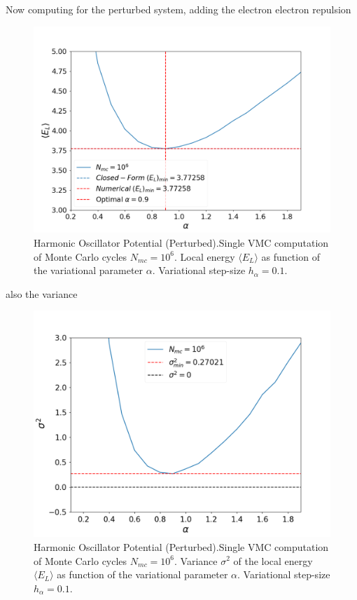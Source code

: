 \documentclass[aip,nobalancelastpage,
twocolumn,
rsi,%
 amsmath,amssymb,
 reprint,%
]{revtex4}
\begin{document}
Now computing for the perturbed system, adding the electron electron repulsion

\begin{figure}[H]
\center
\includegraphics[scale=0.32]{figsPartI/IStabilityPertE.png}
\caption{Harmonic Oscillator Potential (Perturbed).\newline Single VMC computation of Monte Carlo cycles $N_{mc}=10^6$. Local energy $\langle E_L \rangle$ as function of the variational parameter $\alpha$. Variational step-size $h_\alpha = 0.1$.}
\label{Ifig5}
\end{figure}

also the variance

\begin{figure}[H]
\center
\includegraphics[scale=0.32]{figsPartI/IStabilityPertSigma.png}
\caption{Harmonic Oscillator Potential (Perturbed).\newline Single VMC computation of Monte Carlo cycles $N_{mc}=10^6$. Variance $\sigma^2$ of the local energy $\langle E_L \rangle$ as function of the variational parameter $\alpha$. Variational step-size $h_\alpha = 0.1$.}
\label{Ifig6}
\end{figure}
\end{document}
